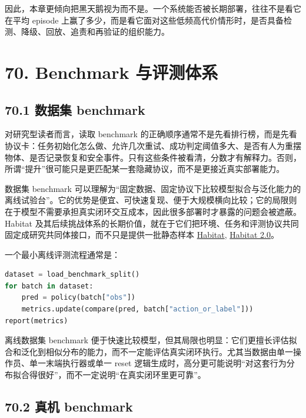 因此，本章更倾向把黑天鹅视为\texttt{}而不是\texttt{}。一个系统能否被长期部署，往往不是看它在平均 episode 上赢了多少，而是看它面对这些低频高代价情形时，是否具备检测、降级、回放、追责和再验证的组织能力。

\chapter*{70. Benchmark 与评测体系}

\section*{70.1 数据集 benchmark}


对研究型读者而言，读取 benchmark 的正确顺序通常不是先看排行榜，而是先看协议卡：任务初始化怎么做、允许几次重试、成功判定阈值多大、是否有人为重摆物体、是否记录恢复和安全事件。只有这些条件被看清，分数才有解释力。否则，所谓“提升”很可能只是更匹配某一套隐藏协议，而不是更接近真实部署能力。

数据集 benchmark 可以理解为“固定数据、固定协议下比较模型拟合与泛化能力的离线试验台”。它的优势是便宜、可快速复现、便于大规模横向比较；它的局限则在于模型不需要承担真实闭环交互成本，因此很多部署时才暴露的问题会被遮蔽。Habitat 及其后续挑战体系的长期价值，就在于它们把环境、任务和评测协议共同固定成研究共同体接口，而不只是提供一批静态样本 \href{https://arxiv.org/abs/1904.01201}{Habitat}, \href{https://arxiv.org/abs/2106.14405}{Habitat 2.0}。

一个最小离线评测流程通常是：

\begin{lstlisting}[language=python]
dataset = load_benchmark_split()
for batch in dataset:
    pred = policy(batch["obs"])
    metrics.update(compare(pred, batch["action_or_label"]))
report(metrics)
\end{lstlisting}

离线数据集 benchmark 便于快速比较模型，但其局限也明显：它们更擅长评估拟合和泛化到相似分布的能力，而不一定能评估真实闭环执行。尤其当数据由单一操作员、单一末端执行器或单一 reset 逻辑生成时，高分更可能说明“对这套行为分布拟合得很好”，而不一定说明“在真实闭环里更可靠”。

\section*{70.2 真机 benchmark}


